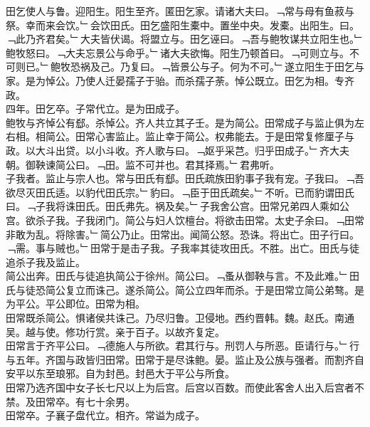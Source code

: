 \documentclass{zhvt-classic}
\begin{document}
\hspace*{2em}田乞使人与鲁。迎阳生。阳生至齐。匿田乞家。请诸大夫曰。﹁常与母有鱼菽与祭。幸而来会饮。﹂会饮田氏。田乞盛阳生橐中。置坐中央。发橐。出阳生。曰。﹁此乃齐君矣。﹂大夫皆伏谒。将盟立与。田乞诬曰。﹁吾与鲍牧谋共立阳生也。﹂鲍牧怒曰。﹁大夫忘景公与命乎。﹂诸大夫欲悔。阳生乃顿首曰。﹁可则立与。不可则已。﹂鲍牧恐祸及己。乃复曰。﹁皆景公与子。何为不可。﹂遂立阳生于田乞与家。是为悼公。乃使人迁晏孺子于骀。而杀孺子荼。悼公既立。田乞为相。专齐政。\\
\hspace*{2em}四年。田乞卒。子常代立。是为田成子。\\
\hspace*{2em}鲍牧与齐悼公有郄。杀悼公。齐人共立其子壬。是为简公。田常成子与监止俱为左右相。相简公。田常心害监止。监止幸于简公。权弗能去。于是田常复修厘子与政。以大斗出贷。以小斗收。齐人歌与曰。﹁妪乎采芑。归乎田成子。﹂齐大夫朝。御鞅谏简公曰。﹁田。监不可并也。君其择焉。﹂君弗听。\\
\hspace*{2em}子我者。监止与宗人也。常与田氏有郄。田氏疏族田豹事子我有宠。子我曰。﹁吾欲尽灭田氏适。以豹代田氏宗。﹂豹曰。﹁臣于田氏疏矣。﹂不听。已而豹谓田氏曰。﹁子我将诛田氏。田氏弗先。祸及矣。﹂子我舍公宫。田常兄弟四人乘如公宫。欲杀子我。子我闭门。简公与妇人饮檀台。将欲击田常。太史子余曰。﹁田常非敢为乱。将除害。﹂简公乃止。田常出。闻简公怒。恐诛。将出亡。田子行曰。﹁需。事与贼也。﹂田常于是击子我。子我率其徒攻田氏。不胜。出亡。田氏与徒追杀子我及监止。\\
\hspace*{2em}简公出奔。田氏与徒追执简公于徐州。简公曰。﹁蚤从御鞅与言。不及此难。﹂田氏与徒恐简公复立而诛己。遂杀简公。简公立四年而杀。于是田常立简公弟骜。是为平公。平公即位。田常为相。\\
\hspace*{2em}田常既杀简公。惧诸侯共诛己。乃尽归鲁。卫侵地。西约晋韩。魏。赵氏。南通吴。越与使。修功行赏。亲于百子。以故齐复定。\\
\hspace*{2em}田常言于齐平公曰。﹁德施人与所欲。君其行与。刑罚人与所恶。臣请行与。﹂行与五年。齐国与政皆归田常。田常于是尽诛鲍。晏。监止及公族与强者。而割齐自安平以东至琅邪。自为封邑。封邑大于平公与所食。\\
\hspace*{2em}田常乃选齐国中女子长七尺以上为后宫。后宫以百数。而使此客舍人出入后宫者不禁。及田常卒。有七十余男。\\
\hspace*{2em}田常卒。子襄子盘代立。相齐。常谥为成子。\\
\end{document}
